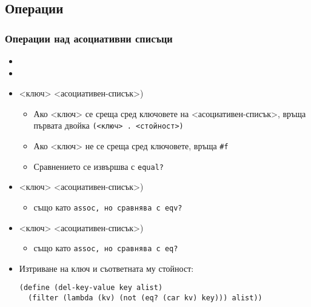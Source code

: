 \documentclass{beamer}
\begin{document}
\subsection{Операции}

\begin{frame}[fragile]
  \frametitle{Операции над асоциативни списъци}

  \begin{itemize}[<+->]
  \item {}
  \item {}
  \item {}<ключ> <асоциативен-списък>\tta)
    \begin{itemize}[<.->]
    \item Ако <ключ> се среща сред ключовете на <асоциативен-списък>,
      връща първата двойка \tt(<ключ> \tt. <стойност>\tt)
    \item Ако <ключ> не се среща сред ключовете, връща \tt{\#f}
    \item Сравнението се извършва с \tt{equal?}
    \end{itemize}
  \item {}<ключ> <асоциативен-списък>\tta)
    \begin{itemize}[<.->]
    \item също като \tt{assoc}, но сравнява с \tt{eqv?}
    \end{itemize}
  \item {}<ключ> <асоциативен-списък>\tta)
    \begin{itemize}[<.->]
    \item също като \tt{assoc}, но сравнява с \tt{eq?}
    \end{itemize}
  \item Изтриване на ключ и съответната му стойност:\\
    \onslide<+->
\begin{lstlisting}
(define (del-key-value key alist)
  (filter (lambda (kv) (not (eq? (car kv) key))) alist))
\end{lstlisting}
  \end{itemize}
\end{frame}
\end{document}
